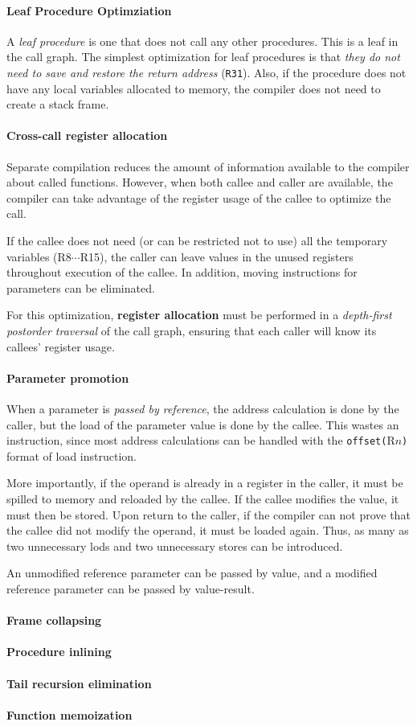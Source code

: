 \documentclass{memo}
\begin{document}
\paragraph{Leaf Procedure Optimziation}
A {\em leaf procedure} is one that does not call any other procedures. 
This is a leaf in the call graph. The simplest optimization for leaf
procedures is that {\em they do not need to save and restore the return
  address\/} (\verb+R31+). Also, if the procedure does not have any local
variables allocated to memory, the compiler does not need to create a stack
frame. 

\paragraph{Cross-call register allocation}
Separate compilation reduces the amount of information available to the
compiler about called functions. However, when both callee and caller are
available, the compiler can take advantage of the register usage of the callee
to optimize the call.

If the callee does not need (or can be restricted not to use) all the
temporary variables (R8$\cdots$R15), the caller can leave values in the unused
registers throughout execution of the callee. In addition, moving instructions
for parameters can be eliminated.


For this optimization, {\bf register allocation\/} must be performed in a
{\em depth-first postorder traversal\/} of the call graph, ensuring that each
caller will know its callees' register usage.

\paragraph{Parameter promotion}
When a parameter is {\em passed by reference\/}, the address calculation is
done by the caller, but the load of the parameter value is done by the
callee.  This wastes an instruction, since most address calculations can be
handled with the \verb+offset(+R$n$\verb+)+ format of load instruction. 

More importantly, if the operand is already in a register in the caller, it
must be spilled to memory and reloaded by the callee. If the callee modifies
the value, it must then be stored. Upon return to the caller, if the compiler
can not prove that the callee did not modify the operand, it must be loaded
again. Thus, as many as two unnecessary lods and two unnecessary stores can be
introduced.

An unmodified reference parameter can be passed by value, and a modified
reference parameter can be passed by value-result.  


\paragraph{Frame collapsing}

\paragraph{Procedure inlining}

\paragraph{Tail recursion elimination}

\paragraph{Function memoization}
\end{document}
